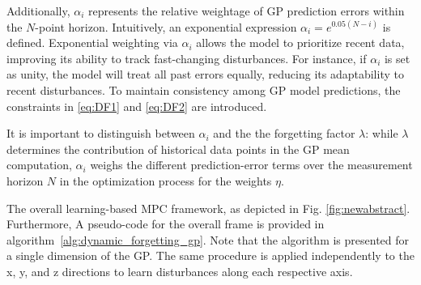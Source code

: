 


Additionally, $\alpha_i$ represents the relative weightage of \ac{GP} prediction errors within the $N$-point horizon. Intuitively, an exponential expression $\alpha_i = e^{0.05 (N - i)}$ is defined. Exponential weighting via $\alpha_i$ allows the model to prioritize recent data, improving its ability to track fast-changing disturbances. For instance, if $\alpha_i$ is set as unity, the model will treat all past errors equally, reducing its adaptability to recent disturbances. To maintain consistency among \ac{GP} model predictions, the constraints in \eqref{eq:DF1} and \eqref{eq:DF2} are introduced.




\begin{remark}
It is important to distinguish between $\alpha_i$ and the the forgetting factor $\lambda$: while $\lambda$ determines the contribution of historical data points in the \ac{GP} mean computation, \(\alpha_i\) weighs the different prediction-error terms over the measurement horizon \(N\) in the optimization process for the weights \(\eta\). 
\end{remark}




The overall learning-based MPC framework, as depicted in Fig. \ref{fig:newabstract}. Furthermore, A pseudo-code for the overall frame is provided in algorithm~\ref{alg:dynamic_forgetting_gp}. Note that the algorithm is presented for a single dimension of the \ac{GP}. The same procedure is applied independently to the x, y, and z directions to learn disturbances along each respective axis.



